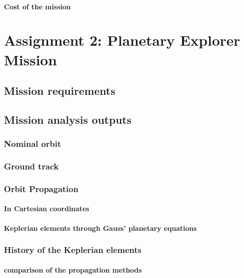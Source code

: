 \documentclass[11pt,a4paper]{report}
\begin{document}
\subsection{Cost of the mission}


\part{Assignment 2: Planetary Explorer Mission}
\chapter{Mission requirements}
\chapter{Mission analysis outputs}
\section{Nominal orbit}
\section{Ground track}
\section{Orbit Propagation}
\subsection{In Cartesian coordinates}
\subsection{Keplerian elements through Gauss’ planetary equations}
\section{History of the Keplerian elements}
\subsection{comparison of the propagation methods}
\end{document}
